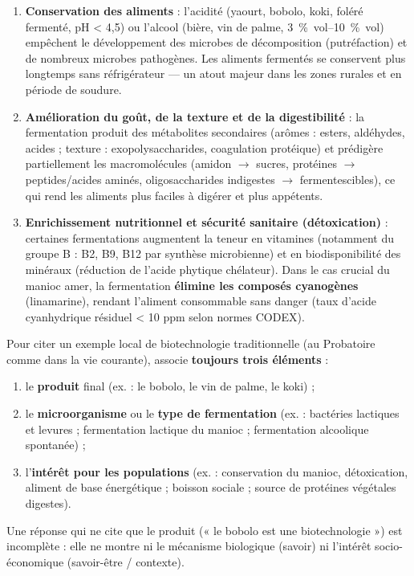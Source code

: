 \documentclass[11pt]{article}
\begin{document}
\begin{aretenir}
\begin{enumerate}
\item \textbf{Conservation des aliments} : l'acidité (yaourt, bobolo, koki, foléré fermenté, pH < 4,5) ou l'alcool (bière, vin de palme, \SIrange{3}{10}{\% vol}) empêchent le développement des microbes de décomposition (putréfaction) et de nombreux microbes pathogènes. Les aliments fermentés se conservent plus longtemps sans réfrigérateur — un atout majeur dans les zones rurales et en période de soudure.
\item \textbf{Amélioration du goût, de la texture et de la digestibilité} : la fermentation produit des métabolites secondaires (arômes : esters, aldéhydes, acides ; texture : exopolysaccharides, coagulation protéique) et prédigère partiellement les macromolécules (amidon $\rightarrow$ sucres, protéines $\rightarrow$ peptides/acides aminés, oligosaccharides indigestes $\rightarrow$ fermentescibles), ce qui rend les aliments plus faciles à digérer et plus appétents.
\item \textbf{Enrichissement nutritionnel et sécurité sanitaire (détoxication)} : certaines fermentations augmentent la teneur en vitamines (notamment du groupe B : B2, B9, B12 par synthèse microbienne) et en biodisponibilité des minéraux (réduction de l'acide phytique chélateur). Dans le cas crucial du manioc amer, la fermentation \textbf{élimine les composés cyanogènes} (linamarine), rendant l'aliment consommable sans danger (taux d'acide cyanhydrique résiduel < 10 ppm selon normes CODEX).
\end{enumerate}
\end{aretenir}

\begin{methode}
Pour citer un exemple local de biotechnologie traditionnelle (au Probatoire comme dans la vie courante), associe \textbf{toujours trois éléments} :
\begin{enumerate}
\item le \textbf{produit} final (ex. : le bobolo, le vin de palme, le koki) ;
\item le \textbf{microorganisme} ou le \textbf{type de fermentation} (ex. : bactéries lactiques et levures ; fermentation lactique du manioc ; fermentation alcoolique spontanée) ;
\item l'\textbf{intérêt pour les populations} (ex. : conservation du manioc, détoxication, aliment de base énergétique ; boisson sociale ; source de protéines végétales digestes).
\end{enumerate}
Une réponse qui ne cite que le produit (« le bobolo est une biotechnologie ») est incomplète : elle ne montre ni le mécanisme biologique (savoir) ni l'intérêt socio-économique (savoir-être / contexte).
\end{methode}
\end{document}
